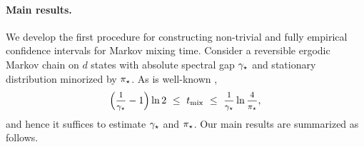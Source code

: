 \paragraph{Main results.}
We develop the first procedure for constructing non-trivial
and fully empirical confidence intervals for Markov mixing time.
Consider a reversible ergodic Markov chain on $d$ states with absolute
spectral gap $\gamma_{\star}$ and stationary distribution minorized by $\pi_{\star}$. 
As is well-known \citep[Theorems~12.3 and~12.4]{LePeWi08},
\begin{equation}
  \label{eq:mixing-time-bound}
  \Parens{\mfrac1{\gap} - 1} \ln2
  \ \leq \ \tmix
  \ \leq \ \mfrac1{\gap} \ln \mfrac4{\pimin}
  ,
\end{equation}
and hence it suffices to estimate $\gamma_{\star}$ and $\pi_{\star}$. 
Our main results are summarized as follows.
